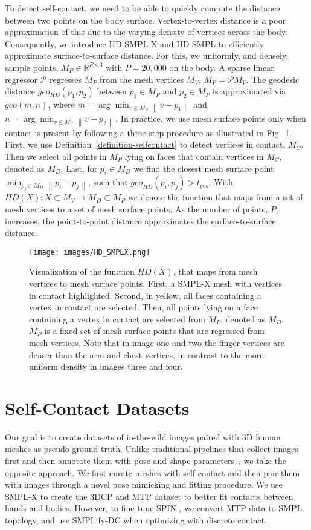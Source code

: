 \documentclass[final]{cvpr}
\newcommand{\geoth}{t_{\mathit{geo}}}
\newcommand{\smplifyxdc}{\mbox{SMPLify-DC}\xspace}
\theoremstyle{definition}
\begin{document}
To detect self-contact, we need to be able to quickly compute the distance between two points on the body surface.
Vertex-to-vertex distance is a poor approximation of this due to the varying density of vertices across the body.
Consequently, we introduce HD SMPL-X and HD SMPL to efficiently approximate surface-to-surface distance.
For this, we uniformly, and densely, sample points, $M_P \in \mathbb{R}^{P\times3} \text{ with }P=20,000$ on the body. 
A sparse linear regressor $\mathcal{P}$ regresses $M_P$ from the mesh vertices $M_V$, $M_P = \mathcal{P} M_V$. The geodesic distance $geo_{\mathit{HD}}(p_1, p_2)$ 
between $p_1 \in M_P$ and $p_2 \in M_P$ is approximated via $\mathit{geo}(m,n)$, where $m = \arg\min_{v \in M_V} \left\|v - p_1\right\| $ 
and $n = \arg\min_{v \in M_V} \left\| v - p_2\right\| $.
In practice, we use mesh surface points only when contact is present by following a three-step procedure as illustrated in Fig.~\ref{fig:HD_SMPLX}. First, we use 
Definition~\ref{definition-selfcontact} to detect vertices in contact, $M_C$. Then we select all points 
in $M_P$ lying on faces that contain vertices in $M_C$, denoted as $M_D$. Last, for $p_i \in M_D$ we find the 
closest mesh surface point $\min_{p_j \in M_D}\left\| p_i-p_j\right\| $, such that 
$\mathit{geo}_{\mathit{HD}}(p_i, p_j) > \geoth$. With $\mathit{HD}(X): X \subset M_V \rightarrow M_D \subset M_P $ 
we denote the function that maps from a set of mesh vertices to a set of mesh surface points.
As the number of points, $P$, increases, the point-to-point distance approximates the surface-to-surface distance.

\begin{figure}
\centerline{	\texttt{[image: images/HD\_SMPLX.png]}}
	\caption{Visualization of the function $\mathit{HD}(X)$, that maps from mesh vertices to mesh surface points. First, a SMPL-X mesh with vertices in contact highlighted. Second, in yellow, all faces containing a vertex in contact are selected. Then, all points lying on a face containing a vertex in contact are selected from $M_P$, denoted as $M_D$. $M_P$ is a fixed set of mesh surface points that are regressed from mesh vertices. Note that in image one and two the finger vertices are denser than the arm and chest vertices, in contrast to the more uniform density in images three and four.}
	\label{fig:HD_SMPLX}
\end{figure} 	\section{Self-Contact Datasets}
\label{section:SelfContactDatasets}
Our goal is to create datasets of in-the-wild images paired with 3D human meshes as pseudo ground truth. 
Unlike traditional pipelines that collect images first and then annotate them with pose and shape parameters~\cite{joo2020eft,vonMarcard2018}, we take the opposite approach. 
We first curate meshes with self-contact and then pair them with images through a novel  pose mimicking and fitting procedure. 
We use SMPL-X to create the 3DCP and MTP dataset to better fit contacts between hands and bodies. However, to fine-tune SPIN \cite{kolotouros2019learning}, we convert MTP data to SMPL topology, and use \smplifyxdc when optimizing with discrete contact.
\end{document}
